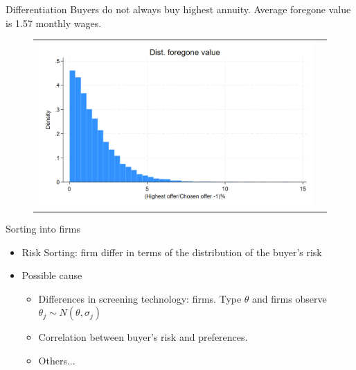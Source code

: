 \documentclass[10pt,aspectratio=169]{beamer}
\begin{document}
\begin{frame}{Differentiation}\label{slide:fig2}    
Buyers do not always buy highest annuity. Average foregone value is 1.57 monthly wages.
\begin{figure}[H]
\centering{}%
\begin{tabular}{cc}
\includegraphics[scale=0.25]{../figures/IE3/IE3_foregone_hist.png}
\end{tabular}
\end{figure}
\hyperlink{slide:Descriptive_evidence}{}
\end{frame}


\begin{frame}{Sorting into firms}
    \begin{itemize}
        \item Risk Sorting: firm differ in terms of the distribution of the buyer's risk

        \item Possible cause 
        \begin{itemize}
            \item Differences in screening technology: firms. Type $\theta$ and firms observe $\theta_j\sim N(\theta, \sigma_j)$ 
            \item Correlation between buyer's risk and preferences. 
            \item Others... 
        \end{itemize}
    \end{itemize}
\end{frame}


\end{document}
